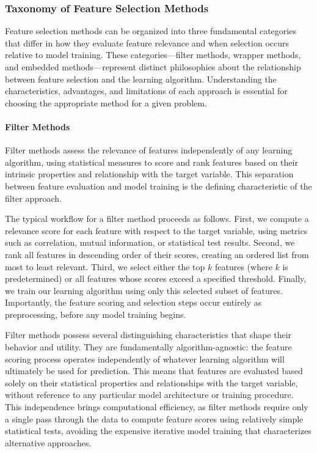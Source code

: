 \subsubsection*{Taxonomy of Feature Selection Methods}

Feature selection methods can be organized into three fundamental categories that differ in how they evaluate feature relevance and when selection occurs relative to model training. These categories—filter methods, wrapper methods, and embedded methods—represent distinct philosophies about the relationship between feature selection and the learning algorithm. Understanding the characteristics, advantages, and limitations of each approach is essential for choosing the appropriate method for a given problem.

\paragraph{Filter Methods}

Filter methods assess the relevance of features independently of any learning algorithm, using statistical measures to score and rank features based on their intrinsic properties and relationship with the target variable. This separation between feature evaluation and model training is the defining characteristic of the filter approach.

The typical workflow for a filter method proceeds as follows. First, we compute a relevance score for each feature with respect to the target variable, using metrics such as correlation, mutual information, or statistical test results. Second, we rank all features in descending order of their scores, creating an ordered list from most to least relevant. Third, we select either the top $k$ features (where $k$ is predetermined) or all features whose scores exceed a specified threshold. Finally, we train our learning algorithm using only this selected subset of features. Importantly, the feature scoring and selection steps occur entirely as preprocessing, before any model training begins.

Filter methods possess several distinguishing characteristics that shape their behavior and utility. They are fundamentally algorithm-agnostic: the feature scoring process operates independently of whatever learning algorithm will ultimately be used for prediction. This means that features are evaluated based solely on their statistical properties and relationships with the target variable, without reference to any particular model architecture or training procedure. This independence brings computational efficiency, as filter methods require only a single pass through the data to compute feature scores using relatively simple statistical tests, avoiding the expensive iterative model training that characterizes alternative approaches.

